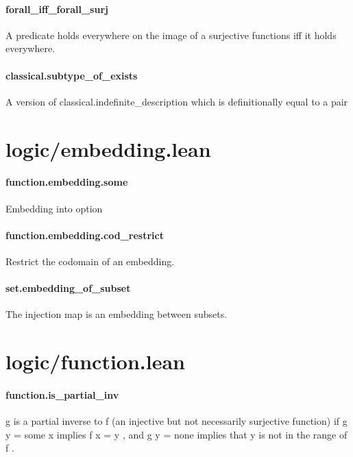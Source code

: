 \documentclass{article}
\begin{document}
\paragraph{forall\_iff\_forall\_surj}
\par
A predicate holds everywhere on the image of a surjective functions iff
it holds everywhere.
\paragraph{classical.subtype\_of\_exists}
\par
A version of classical.indefinite\_description which is definitionally equal to a pair
\section{logic/embedding.lean}\paragraph{function.embedding.some}
\par
Embedding into 
\colorbox[RGB]{253,246,227}{{{{\color[RGB]{101, 123, 131} option }}}}\paragraph{function.embedding.cod\_restrict}
\par
Restrict the codomain of an embedding.
\paragraph{set.embedding\_of\_subset}
\par
The injection map is an embedding between subsets.
\section{logic/function.lean}\paragraph{function.is\_partial\_inv}
\par
\colorbox[RGB]{253,246,227}{{{{\color[RGB]{101, 123, 131} g }}}} is a partial inverse to 
\colorbox[RGB]{253,246,227}{{{{\color[RGB]{101, 123, 131} f }}}} (an injective but not necessarily
surjective function) if 
\colorbox[RGB]{253,246,227}{{{{\color[RGB]{101, 123, 131} g y  }}}{{{\color[RGB]{181, 137, 0} = }}}{{{\color[RGB]{101, 123, 131}  some x }}}} implies 
\colorbox[RGB]{253,246,227}{{{{\color[RGB]{101, 123, 131} f x  }}}{{{\color[RGB]{181, 137, 0} = }}}{{{\color[RGB]{101, 123, 131}  y }}}}, and 
\colorbox[RGB]{253,246,227}{{{{\color[RGB]{101, 123, 131} g y  }}}{{{\color[RGB]{181, 137, 0} = }}}{{{\color[RGB]{101, 123, 131}  none }}}}implies that 
\colorbox[RGB]{253,246,227}{{{{\color[RGB]{101, 123, 131} y }}}} is not in the range of 
\colorbox[RGB]{253,246,227}{{{{\color[RGB]{101, 123, 131} f }}}}.
\end{document}
